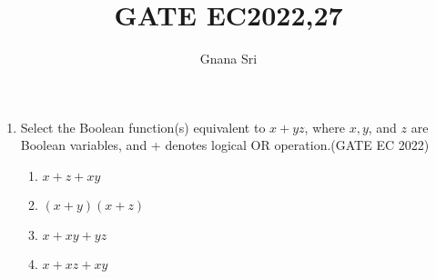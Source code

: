 \documentclass{article}
\begin{document}
\title{GATE EC2022,27}
\author{Gnana Sri}
\maketitle

\begin{enumerate}
	\item Select the Boolean function(s) equivalent to $x + yz$, where $x,y$, and $z$ are Boolean variables, and + denotes logical OR  operation.\hfill(GATE EC 2022)
		\begin{enumerate}[label=(\Alph*)]
			\item $x + z + {xy}$
			\item ${(x + y)}{(x + z)}$
			\item $x + {xy} + {yz}$
			\item $x + {xz} + {xy}$
		\end{enumerate}
\end{enumerate}
\end{document}
